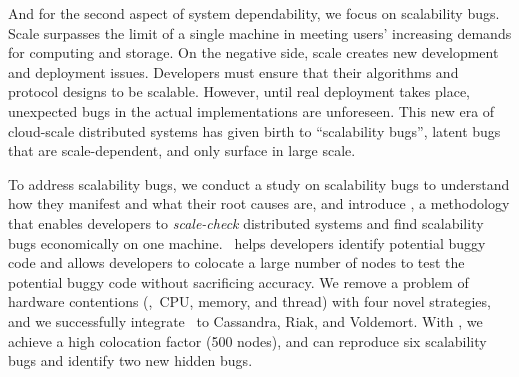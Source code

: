 And for the second aspect of system dependability, we focus on scalability bugs.
Scale surpasses the limit of a single machine in meeting users' increasing
demands for computing and storage. On the negative side, scale creates new
development and deployment issues. Developers must ensure that their algorithms
and protocol designs to be scalable. However, until real deployment takes place,
unexpected bugs in the actual implementations are unforeseen. This new era of
cloud-scale distributed systems has given birth to ``scalability bugs'', latent
bugs that are scale-dependent, and only surface in large scale.

To address scalability bugs, we conduct a study on scalability bugs to
understand how they manifest and what their root causes are, and introduce \sck,
a methodology that enables developers to {\em scale-check} distributed systems
and find scalability bugs economically on one machine. \sck\ helps developers
identify potential buggy code and allows developers to colocate a large number
of nodes to test the potential buggy code without sacrificing accuracy. We
remove a problem of hardware contentions (\ie,\ CPU, memory, and thread) with
four novel strategies, and we successfully integrate \sck\ to Cassandra, Riak,
and Voldemort. With \sck, we achieve a high colocation factor (500 nodes), and
can reproduce six scalability bugs and identify two new hidden bugs.
